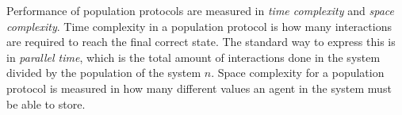 Performance of population protocols are measured in \emph{time complexity} and \emph{space complexity}. Time complexity in a population protocol is how many interactions are required to reach the final correct state. The standard way to express this is in \emph{parallel time}, which is the total amount of interactions done in the system divided by the population of the system $n$. Space complexity for a population protocol is measured in how many different values an agent in the system must be able to store. 

